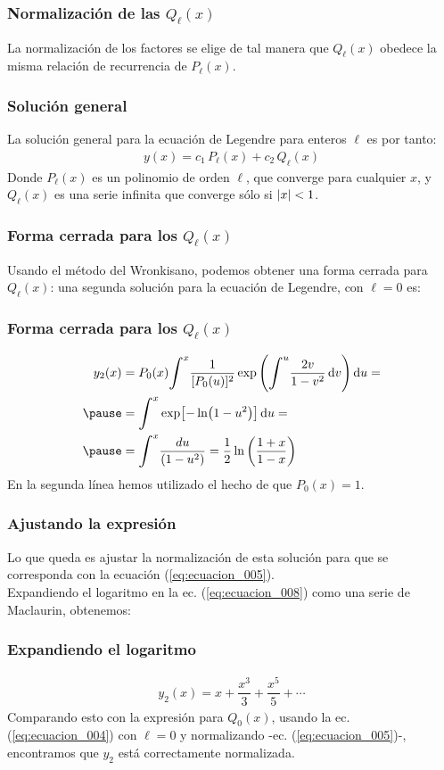 \documentclass[12pt]{beamer}
\begin{document}
\begin{frame}
\frametitle{Normalización de las $Q_{\ell} (x)$}
La normalización de los factores se elige de tal manera que $Q_{\ell} (x)$ obedece la misma relación de recurrencia de $P_{\ell}(x)$.
\end{frame}
\begin{frame}
\frametitle{Solución general}
La solución general para la ecuación de Legendre para enteros $\ell$ es por tanto:
\pause
\begin{align}
y (x) = c_{1} \, P_{\ell} (x) + c_{2} \, Q_{\ell} (x) 
\label{eq:ecuacion_18_07}
\end{align}
Donde $P_{\ell} (x)$ es un polinomio de orden $\ell$, que converge para cualquier $x$, y $Q_{\ell} (x)$ es una serie infinita que converge sólo si $\abs{x} < 1$.
\end{frame}
\begin{frame}
\frametitle{Forma cerrada para los $Q_{\ell} (x)$}
Usando el método del Wronkisano, podemos obtener una forma cerrada para $Q_{\ell} (x)$: \pause una segunda solución para la ecuación de Legendre, con $\ell = 0$ es:
\end{frame}
\begin{frame}
\frametitle{Forma cerrada para los $Q_{\ell} (x)$}
\begin{eqnarray}
\begin{aligned}
y_{2}(x) &= P_{0}(x) \scaleint{6ex}^{x} \dfrac{1}{[P_{0}(u)]^{2}} \exp \left( \scaleint{6ex}^{u} \dfrac{2v}{1-v^{2}} \dd{v} \right) \dd{u} = \\ \pause
&= \scaleint{6ex}^{x} \exp [ - \ln (1 - u^{2}) ] \dd{u} = \\ \pause
&= \scaleint{6ex}^{x} \dfrac{du}{(1-u^{2})} = \frac{1}{2} \ln \left( \dfrac{1+x}{1-x} \right)
\end{aligned}
\label{eq:ecuacion_008}
\end{eqnarray}
\pause
En la segunda línea hemos utilizado el hecho de que $P_{0} (x) = 1$.
\end{frame}
\begin{frame}
\frametitle{Ajustando la expresión}
Lo que queda es ajustar la normalización de esta solución para que se corresponda con la ecuación (\ref{eq:ecuacion_005}).
\\
\bigskip
\pause
Expandiendo el logaritmo en la ec. (\ref{eq:ecuacion_008}) como una serie de Maclaurin, obtenemos:
\end{frame}
\begin{frame}
\frametitle{Expandiendo el logaritmo}
\begin{align*}
y_{2} (x) = x + \dfrac{x^{3}}{3} + \dfrac{x^{5}}{5} + \cdots
\end{align*}
\pause
Comparando esto con la expresión para $Q_{0} (x)$, usando la ec. (\ref{eq:ecuacion_004}) con $\ell = 0$ y normalizando -ec. (\ref{eq:ecuacion_005})-, encontramos que $y_{2}$ está correctamente normalizada.
\end{frame}
\end{document}
